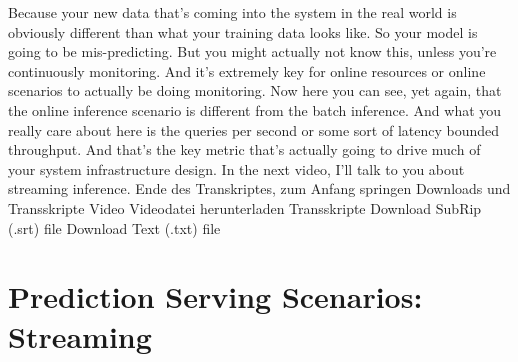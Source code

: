 {{{{{{{    Because your new data that's coming into the system in the real world
    is obviously different than what your training data looks like.
    So your model is going to be mis-predicting.
    But you might actually not know this, unless you're continuously monitoring.
    And it's extremely key for online resources or online scenarios
    to actually be doing monitoring.
    Now here you can see, yet again, that the online inference scenario
    is different from the batch inference.
    And what you really care about here is the queries per second
    or some sort of latency bounded throughput.
    And that's the key metric that's actually
    going to drive much of your system infrastructure design.
    In the next video, I'll talk to you about streaming inference.
    Ende des Transkriptes, zum Anfang springen
    Downloads und Transskripte
    Video
    Videodatei herunterladen
    Transskripte
    Download SubRip (.srt) file
    Download Text (.txt) file

\section{Prediction Serving Scenarios: Streaming}

}}}}}}}
